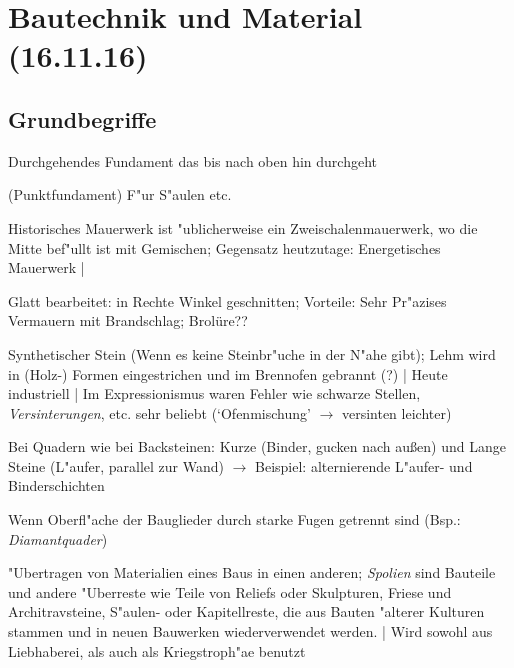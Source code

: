 \documentclass[emulatestandardclasses]{scrartcl}
\begin{document}
\section{Bautechnik und Material\\(16.11.16)}

\subsection{Grundbegriffe}

\begin{description}[leftmargin=!,labelwidth=\widthof{\bfseries Stahlbetonskelettbau}]
  \item[Streifenfundament] Durchgehendes Fundament das bis nach oben hin durchgeht
  \item[Einzelfundament] (Punktfundament) F"ur S"aulen etc.
  \item[Mauerwerk] Historisches Mauerwerk ist "ublicherweise ein Zweischalenmauerwerk, wo die Mitte bef"ullt ist mit Gemischen; Gegensatz heutzutage: Energetisches Mauerwerk | 
  \item[Quader] Glatt bearbeitet: in Rechte Winkel geschnitten; Vorteile: Sehr Pr"azises Vermauern mit Brandschlag; Brolüre??
  \item[Backstein] Synthetischer Stein (Wenn es keine Steinbr"uche in der N"ahe gibt); Lehm wird in (Holz-) Formen eingestrichen und im Brennofen gebrannt (?) | Heute industriell | Im Expressionismus waren Fehler wie schwarze Stellen, \emph{Versinterungen}, etc. sehr beliebt (`Ofenmischung' $\rightarrow$ versinten leichter)
  \item[Binder \& L"aufer] Bei Quadern wie bei Backsteinen: Kurze (Binder, gucken nach au\ss en) und Lange Steine (L"aufer, parallel zur Wand) $\rightarrow$ Beispiel: alternierende L"aufer- und Binderschichten
  \item[Rustizierung] Wenn Oberfl"ache der Bauglieder durch starke Fugen getrennt sind (Bsp.: \emph{Diamantquader})
  \item[Spoliation] "Ubertragen von Materialien eines Baus in einen anderen; \emph{Spolien} sind Bauteile und andere "Uberreste wie Teile von Reliefs oder Skulpturen, Friese und Architravsteine, S"aulen- oder Kapitellreste, die aus Bauten "alterer Kulturen stammen und in neuen Bauwerken wiederverwendet werden. | Wird sowohl aus Liebhaberei, als auch als Kriegstroph"ae benutzt
  \item[Standger"ust]
  \item[Fliegendes Ger"ust]
  \item[Ger"ustloch]

\end{description}
\end{document}

